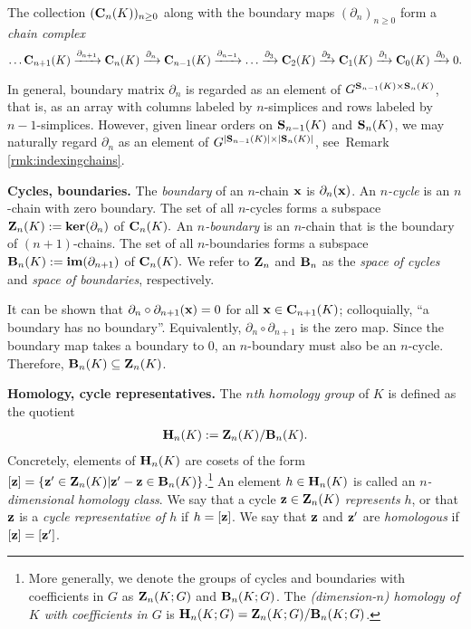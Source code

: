  
The collection  $(\mathbf{C}_n(K))_{n\geq 0}$ along with the boundary maps $(\partial_n)_{n\geq 0}$ form a \textit{chain complex}
\[\ldots \mathbf{C}_{n+1}(K) \xrightarrow{\partial_{n+1}} \mathbf{C}_{n}(K) \xrightarrow{\partial_{n}} \mathbf{C}_{n-1}(K) \xrightarrow{\partial_{n-1}} \ldots \xrightarrow{\partial_3} \mathbf{C}_2(K) \xrightarrow{\partial_2} \mathbf{C}_1(K) \xrightarrow{\partial_1} \mathbf{C}_0(K) \xrightarrow{\partial_0} 0. \]

\begin{remark}
\label{rmk:boundarymatrixindexing}
In general, boundary matrix $\partial_n$ is regarded as an element of $G^{\mathbf{S}_{n-1}(K) \times \mathbf{S}_{n}(K)}$, that is, as an array with columns labeled by $n$-simplices and rows labeled by $n-1$-simplices.  However, given linear orders on  $\mathbf{S}_{n-1}(K)$ and $\mathbf{S}_{n}(K)$, we may naturally regard $\partial_n$ as an element of $G^{|\mathbf{S}_{n-1}(K)| \times |\mathbf{S}_{n}(K)|}$, see\ Remark \ref{rmk:indexingchains}. 
\end{remark} 


\noindent \textbf{Cycles, boundaries.}  The \emph{boundary} of an $n$-chain $\mathbf{x}$ is  $\partial_n (\mathbf{x})$.
An \textit{$n$-cycle} is an $n$-chain with zero boundary. The set of all $n$-cycles forms a subspace $\mathbf{Z}_n(K) := \textbf{ker}(\partial_n)$ of $\mathbf{C}_n(K).$ An \textit{$n$-boundary} is an $n$-chain that is the boundary of $(n+1)$-chains. The set of all $n$-boundaries forms a subspace $\mathbf{B}_n(K):= \textbf{im}(\partial_{n+1})$ of $\mathbf{C}_n(K).$   We refer to $\mathbf{Z}_n$ and $\mathbf{B}_n$ as the \emph{space of cycles} and \emph{space of boundaries}, respectively.

It can be shown that $\partial_n \circ \partial_{n+1}(\mathbf{x}) = 0$ for all $\mathbf{x} \in \mathbf{C}_{n+1}(K)$; colloquially,  ``a boundary has no boundary''. Equivalently,  $\partial_n \circ \partial_{n+1}$ is the zero map.
Since the boundary map takes a boundary to $0$, an $n$-boundary must also be an $n$-cycle. Therefore, $\mathbf{B}_n(K) \subseteq \mathbf{Z}_n(K)$. 




\noindent \textbf{Homology, cycle representatives.} The \emph{$n$th homology group} of $K$ is defined as  the quotient
    \begin{align*}
        \mathbf{H}_n(K): = \mathbf{Z}_n(K) / \mathbf{B}_n(K).
    \end{align*}
Concretely, elements of $\mathbf{H}_n(K)$ are cosets of the form $[{\mathbf z}] = \{ {\mathbf z}'  \in \mathbf{Z}_n(K) | {\mathbf z}' - {\mathbf z} \in \mathbf{B}_n(K)\}$.\footnote{More generally, we denote the groups of cycles and boundaries with coefficients in $G$ as $\mathbf{Z}_n(K; G)$ and $\mathbf{B}_n(K; G)$.  The \emph{(dimension-$n$) homology of $K$ with coefficients in $G$} is $\mathbf{H}_n(K; G) = \mathbf{Z}_n(K; G) / \mathbf{B}_n(K; G)$.}  An element $h \in \mathbf{H}_n(K)$ is called an \emph{$n$-dimensional homology class}.  We say that a cycle ${\mathbf z} \in \mathbf{Z}_n(K)$ \emph{represents} $h$, or that ${\mathbf z}$ is a \emph{cycle representative of $h$} if $h = [{\mathbf z}]$.  We say that ${\mathbf z}$ and ${\mathbf z}'$ are \emph{homologous} if $[{\mathbf z}] = [{\mathbf z}']$.

